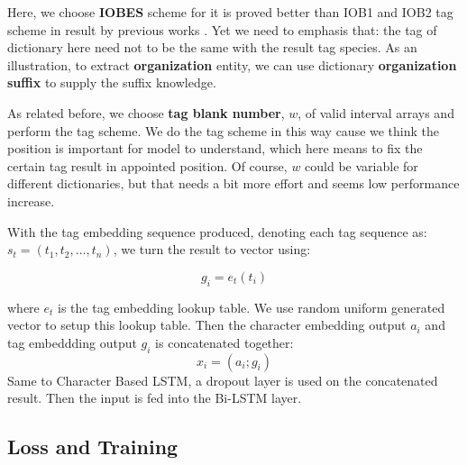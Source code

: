 \documentclass[letterpaper]{article} %
\begin{document}
Here, we choose \textbf{IOBES} scheme for it is proved better than IOB1 and IOB2 tag scheme in result by previous works \cite{char-fea1,mahovy}. Yet we need to emphasis that: the tag of dictionary here need not to be the same with the result tag species. As an illustration, to extract \textbf{organization} entity, we can use dictionary \textbf{organization suffix} to supply the suffix knowledge.

As related before, we choose \textbf{tag blank number}, $w$, of valid interval arrays and perform the tag scheme. We do the tag scheme in this way cause we think the position is important for model to understand, which here means to fix the certain tag result in appointed position. Of course, $w$ could be variable for different dictionaries, but that needs a bit more effort and seems low performance increase.

With the tag embedding sequence produced, denoting each tag sequence as: $s_t = (t_1, t_2, ..., t_n)$, we turn the result to vector using: 

\begin{equation}
g_i = e_t(t_i) \label{tag_embedding}
\end{equation}

where $e_t$ is the tag embedding lookup table. We use random uniform generated vector to setup this lookup table. Then the character embedding output $a_i$ and tag embeddding output $g_i$ is concatenated together:
\begin{equation}
x_i = (a_i;g_i) \label{concat}
\end{equation}
Same to Character Based LSTM, a dropout layer is used on the concatenated result. Then the input is fed into the Bi-LSTM layer.  

\begin{table}[t]
\caption{Statistics of Sogou MusicNER dataset.}\smallskip
\centering
{}
\label{table1}
\end{table}



\subsection{Loss and Training}
\end{document}
